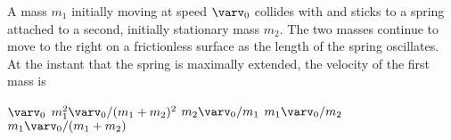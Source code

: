 \documentclass{../../oss-apphys-exam}
\begin{document}
\begin{multicols*}{2}
\begin{questions}
    \question A mass $m_1$ initially moving at speed $\varv_0$ collides with and
    sticks to a spring attached to a second, initially stationary mass $m_2$.
    The two masses continue to move to the right on a frictionless surface as
    the length of the spring oscillates. At the instant that the spring is
    maximally extended, the velocity of the first mass is
    \begin{center}
    \end{center}
    \begin{choices}
      \choice $\varv_0$
      \choice $m_1^2\varv_0/(m_1+m_2)^2$
      \choice $m_2\varv_0/m_1$
      \choice $m_1\varv_0/m_2$
      \choice $m_1\varv_0/(m_1+m_2)$
    \end{choices}
  \end{questions}
\end{multicols*}
\newpage



\genfreedirections
\end{document}
